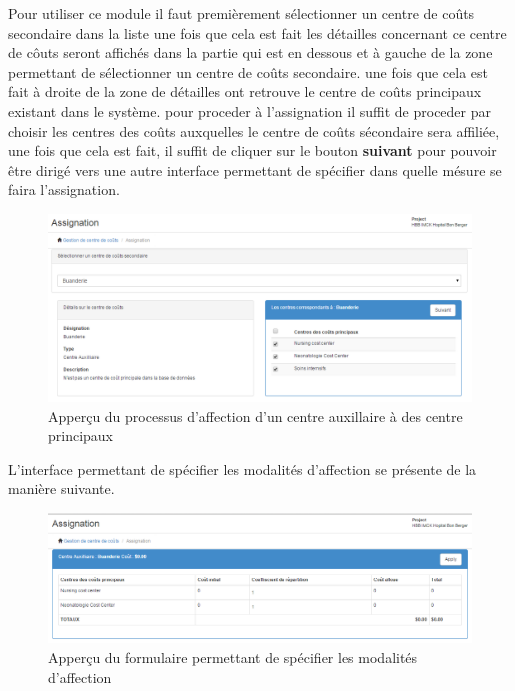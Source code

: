 \documentclass[12pt,a4paper]{report}
\begin{document}
Pour utiliser ce module il faut premièrement sélectionner un centre de coûts secondaire dans la liste une fois que cela est fait les détailles concernant ce centre de côuts seront affichés dans la partie qui est en dessous et à gauche de la zone permettant de sélectionner un centre de coûts secondaire. une fois que cela est fait à droite de la zone de détailles ont retrouve le centre de coûts principaux existant dans le système. pour proceder à l'assignation il suffit de proceder par choisir les centres des coûts auxquelles le centre de coûts sécondaire sera affiliée, une fois que cela est fait, il suffit de cliquer sur le bouton \textbf{suivant} pour pouvoir être dirigé vers une autre interface permettant de spécifier dans quelle mésure se faira l'assignation.

\begin{figure}[h]
\begin{center}
\includegraphics[width=12cm]{pic/AssiGCentCout.png}
\end{center}
\caption{Apperçu du processus d'affection d'un centre auxillaire à des centre principaux}
\label{Apperçu du processus d'affection d'un centre auxillaire à des centre principaux}
\end{figure}  

L'interface permettant de spécifier les modalités d'affection se présente de la manière suivante.

\begin{figure}[h]
\begin{center}
\includegraphics[width=12cm]{pic/AssPCCenter.png}
\end{center}
\caption{Apperçu du formulaire permettant de spécifier les modalités d'affection}
\label{Apperçu du formulaire permettant de spécifier les modalités d'affection}
\end{figure}   
\end{document}
